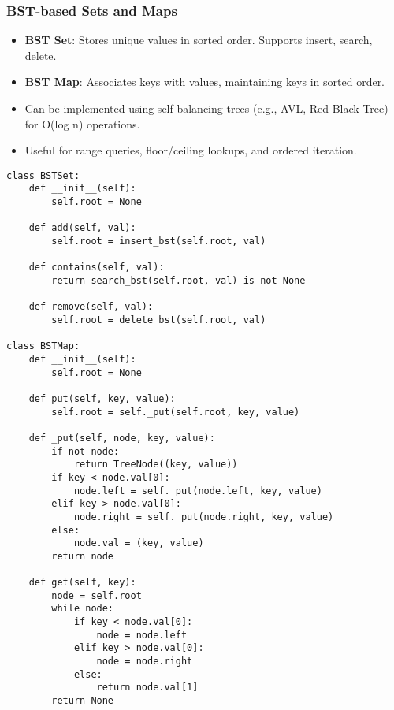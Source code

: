 \subsubsection{BST-based Sets and Maps}

\begin{summary}
    \begin{itemize}
        \item \textbf{BST Set}: Stores unique values in sorted order. Supports insert, search, delete.
        \item \textbf{BST Map}: Associates keys with values, maintaining keys in sorted order.
        \item Can be implemented using self-balancing trees (e.g., AVL, Red-Black Tree) for O(log n) operations.
        \item Useful for range queries, floor/ceiling lookups, and ordered iteration.
    \end{itemize}
\end{summary}

\begin{algo}
\begin{lstlisting}
class BSTSet:
    def __init__(self):
        self.root = None

    def add(self, val):
        self.root = insert_bst(self.root, val)

    def contains(self, val):
        return search_bst(self.root, val) is not None

    def remove(self, val):
        self.root = delete_bst(self.root, val)

class BSTMap:
    def __init__(self):
        self.root = None

    def put(self, key, value):
        self.root = self._put(self.root, key, value)

    def _put(self, node, key, value):
        if not node:
            return TreeNode((key, value))
        if key < node.val[0]:
            node.left = self._put(node.left, key, value)
        elif key > node.val[0]:
            node.right = self._put(node.right, key, value)
        else:
            node.val = (key, value)
        return node

    def get(self, key):
        node = self.root
        while node:
            if key < node.val[0]:
                node = node.left
            elif key > node.val[0]:
                node = node.right
            else:
                return node.val[1]
        return None
\end{lstlisting}
\end{algo}

